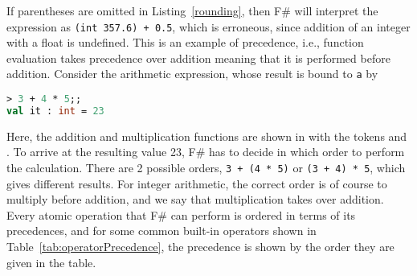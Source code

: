 If parentheses are omitted in Listing~\ref{rounding}, then F\# will interpret the expression as \lstinline|(int 357.6) + 0.5|, which is erroneous, since addition of an integer with a float is undefined. This is an example of precedence, i.e., function evaluation takes precedence over addition meaning that it is performed before addition. Consider the arithmetic expression, whose result is bound to \lstinline|a| by
%
\begin{lstlisting}[language=fsharp,caption={fsharpi, a simple arithmetic expression.}]
> 3 + 4 * 5;;
val it : int = 23
\end{lstlisting}
Here, the addition and multiplication functions are shown in  with the  tokens \token{+} and \token{*}. To arrive at the resulting value 23, F\# has to decide in which order to perform the calculation. There are 2 possible orders, \lstinline|3 + (4 * 5)| or \lstinline|(3 + 4) * 5|, which gives different results. For integer arithmetic, the correct order is of course to multiply before addition, and we say that multiplication takes  over addition. Every atomic operation that F\# can perform is ordered in terms of its precedences, and for some common built-in operators shown in Table~\ref{tab:operatorPrecedence}, the precedence is shown by the order they are given in the table.
